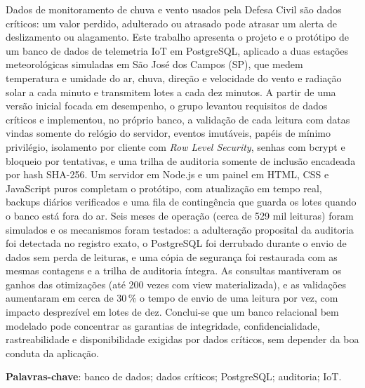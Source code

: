 \setlength{\absparsep}{18pt}
\begin{resumo}
Dados de monitoramento de chuva e vento usados pela Defesa Civil são dados críticos: um valor perdido, adulterado ou atrasado pode atrasar um alerta de deslizamento ou alagamento. Este trabalho apresenta o projeto e o protótipo de um banco de dados de telemetria IoT em PostgreSQL, aplicado a duas estações meteorológicas simuladas em São José dos Campos (SP), que medem temperatura e umidade do ar, chuva, direção e velocidade do vento e radiação solar a cada minuto e transmitem lotes a cada dez minutos. A partir de uma versão inicial focada em desempenho, o grupo levantou requisitos de dados críticos e implementou, no próprio banco, a validação de cada leitura com datas vindas somente do relógio do servidor, eventos imutáveis, papéis de mínimo privilégio, isolamento por cliente com \textit{Row Level Security}, senhas com bcrypt e bloqueio por tentativas, e uma trilha de auditoria somente de inclusão encadeada por hash SHA-256. Um servidor em Node.js e um painel em HTML, CSS e JavaScript puros completam o protótipo, com atualização em tempo real, backups diários verificados e uma fila de contingência que guarda os lotes quando o banco está fora do ar. Seis meses de operação (cerca de 529 mil leituras) foram simulados e os mecanismos foram testados: a adulteração proposital da auditoria foi detectada no registro exato, o PostgreSQL foi derrubado durante o envio de dados sem perda de leituras, e uma cópia de segurança foi restaurada com as mesmas contagens e a trilha de auditoria íntegra. As consultas mantiveram os ganhos das otimizações (até 200 vezes com view materializada), e as validações aumentaram em cerca de 30\,\% o tempo de envio de uma leitura por vez, com impacto desprezível em lotes de dez. Conclui-se que um banco relacional bem modelado pode concentrar as garantias de integridade, confidencialidade, rastreabilidade e disponibilidade exigidas por dados críticos, sem depender da boa conduta da aplicação.

\vspace{\onelineskip}
\noindent\textbf{Palavras-chave}: banco de dados; dados críticos; PostgreSQL; auditoria; IoT.
\end{resumo}

